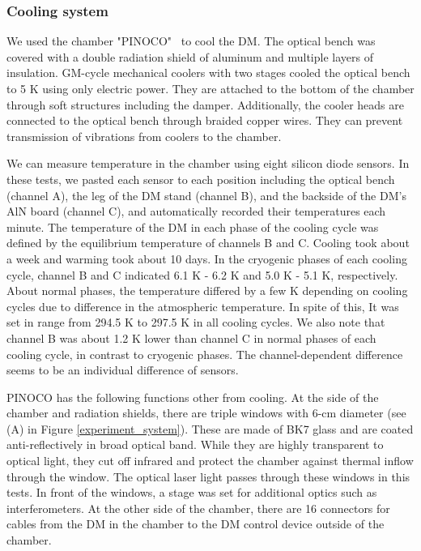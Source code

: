 \documentclass[a4paper]{article}
\begin{document}
\subsubsection{Cooling system}
We used the chamber "PINOCO"~\cite{PINOCO} to cool the DM. The optical bench was covered with a double radiation shield of aluminum and multiple layers of insulation. GM-cycle mechanical coolers with two stages cooled the optical bench to 5 K using only electric power. They are attached to the bottom of the chamber through soft structures including the damper. Additionally, the cooler heads are connected to the optical bench through braided copper wires. They can prevent transmission of vibrations from coolers to the chamber.

We can measure temperature in the chamber using eight silicon diode sensors. In these tests, we pasted each sensor to each position including the optical bench (channel A), the leg of the DM stand (channel B), and the backside of the DM's AlN board (channel C), and automatically recorded their temperatures each minute. The temperature of the DM in each phase of the cooling cycle was defined by the equilibrium temperature of channels B and C. Cooling took about a week and warming took about 10 days. In the cryogenic phases of each cooling cycle, channel B and C indicated 6.1 K - 6.2 K and 5.0 K - 5.1 K, respectively. About normal phases, the temperature differed by a few K depending on cooling cycles due to difference in the atmospheric temperature. In spite of this, It was set in range from 294.5 K to 297.5 K in all cooling cycles. We also note that channel B was about 1.2 K lower than channel C in normal phases of each cooling cycle, in contrast to cryogenic phases. The channel-dependent difference seems to be an individual difference of sensors.

PINOCO has the following functions other from cooling. At the side of the chamber and radiation shields, there are triple windows with 6-cm diameter (see (A) in Figure \ref{experiment_system}). These are made of BK7 glass and are coated anti-reflectively in broad optical band. While they are highly transparent to optical light, they cut off infrared and protect the chamber against thermal inflow through the window. The optical laser light passes through these windows in this tests. In front of the windows, a stage was set for additional optics such as interferometers. At the other side of the chamber, there are 16 connectors for cables from the DM in the chamber to the DM control device outside of the chamber.
\end{document}
